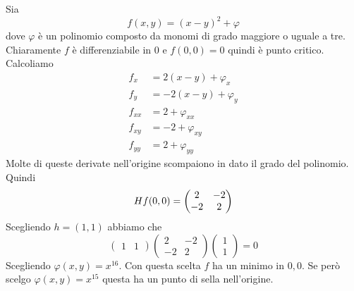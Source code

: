 \documentclass[a4paper]{article}
\begin{document}
\begin{radioactive}
\begin{snippetexample}{}
    Sia \[
        f(x,y) = {(x-y)}^2 + \varphi
    \]
    dove \(\varphi\) è un polinomio composto da monomi di grado maggiore o uguale a tre.
    Chiaramente \(f\) è differenziabile in \(0\)
    e \(f(0,0) = 0\) quindi è punto critico. Calcoliamo
    \begin{align*}
        f_x &= 2(x-y) + \varphi_x \\
        f_y &= -2(x-y) + \varphi_y \\
        f_{xx} &= 2 + \varphi_{xx} \\
        f_{xy} &= -2 + \varphi_{xy} \\
        f_{yy} &= 2 + \varphi_{yy}
    \end{align*}
    Molte di queste derivate nell'origine scompaiono in dato il grado del polinomio.
    Quindi
    \[
        H f(0,0) = \begin{pmatrix}
            2 & -2 \\ -2 & 2 \end{pmatrix}
    \]
    Scegliendo \(h=(1,1)\) abbiamo che
    \[
        \begin{pmatrix}
            1 & 1
        \end{pmatrix}
        \begin{pmatrix}
            2 & -2 \\ -2 & 2
        \end{pmatrix}
        \begin{pmatrix}
            1 \\ 1
        \end{pmatrix}
        = 0
    \]
    Scegliendo \(\varphi(x,y) = x^{16}\).
    Con questa scelta \(f\) ha un minimo in \(0,0\).
    Se però scelgo \(\varphi(x,y) = x^{15}\) questa ha un punto di sella nell'origine.
\end{snippetexample}
\end{radioactive}
\end{document}

